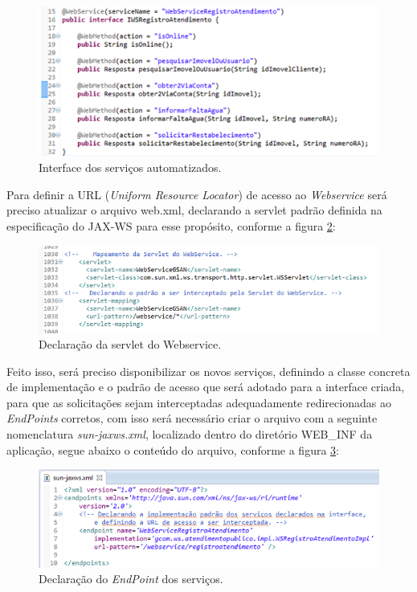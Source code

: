 \begin{figure}[H]
	\centering
	\caption{Interface dos serviços automatizados.}	
	\label{figura:interfaceServicosAutomatizados}
	\includegraphics{figuras/implementacao_servicos.png}
\end{figure}


Para definir a URL (\textit{Uniform Resource Locator}) de acesso ao \textit{Webservice} será preciso atualizar o arquivo web.xml, declarando a servlet padrão definida na especificação do JAX-WS para esse propósito, conforme a figura \ref{figura:declaracaoServlet}:

\begin{figure}[H]
	\centering
	\caption{Declaração da servlet do Webservice.}	
	\label{figura:declaracaoServlet}
	\includegraphics{figuras/declarando_servlet.png}
\end{figure}


Feito isso, será preciso disponibilizar os novos serviços, definindo a classe concreta de implementação e o padrão de acesso que será adotado para a interface criada, para que as solicitações sejam interceptadas adequadamente redirecionadas ao \textit{EndPoints} corretos, com isso será necessário criar o arquivo com a seguinte nomenclatura \textit{sun-jaxws.xml}, localizado dentro do diretório WEB\_INF da aplicação, segue abaixo o conteúdo do arquivo, conforme a figura \ref{figura:declaracaoEndPoint}:

\begin{figure}[H]
	\centering
	\caption{Declaração do \textit{EndPoint} dos serviços.}	
	\label{figura:declaracaoEndPoint}
	\includegraphics{figuras/declaracao_endpoint.png}
\end{figure}

